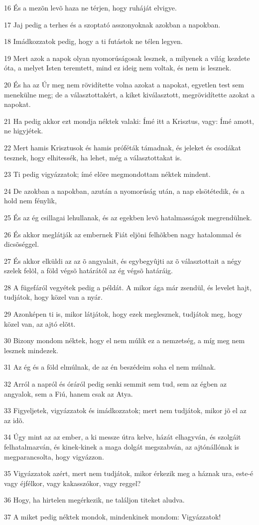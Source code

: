 \par 16 És a mezõn levõ haza ne térjen, hogy ruháját elvigye.
\par 17 Jaj pedig a terhes és a szoptató asszonyoknak azokban a napokban.
\par 18 Imádkozzatok pedig, hogy a ti futástok ne télen legyen.
\par 19 Mert azok a napok olyan nyomorúságosak lesznek, a milyenek a világ kezdete óta, a melyet Isten teremtett, mind ez ideig nem voltak, és nem is lesznek.
\par 20 És ha az Úr meg nem rövidítette volna azokat a napokat, egyetlen test sem menekülne meg; de a választottakért, a kiket kiválasztott, megrövidítette azokat a napokat.
\par 21 Ha pedig akkor ezt mondja néktek valaki: Ímé itt a Krisztus, vagy: Ímé amott, ne higyjétek.
\par 22 Mert hamis Krisztusok és hamis próféták támadnak, és jeleket és csodákat tesznek, hogy elhitessék, ha lehet, még a választottakat is.
\par 23 Ti pedig vigyázzatok; ímé elõre megmondottam néktek mindent.
\par 24 De azokban a napokban, azután a nyomorúság után, a nap elsötétedik, és a hold nem fénylik,
\par 25 És az ég csillagai lehullanak, és az egekben levõ hatalmasságok megrendülnek.
\par 26 És akkor meglátják az embernek Fiát eljõni felhõkben nagy hatalommal és dicsõséggel.
\par 27 És akkor elküldi az az õ angyalait, és egybegyûjti az õ választottait a négy szelek felõl, a föld végsõ határától az ég végsõ határáig.
\par 28 A fügefáról vegyétek pedig a példát. A mikor ága már zsendül, és levelet hajt, tudjátok, hogy közel van a nyár.
\par 29 Azonképen ti is, mikor látjátok, hogy ezek meglesznek, tudjátok meg, hogy közel van, az ajtó elõtt.
\par 30 Bizony mondom néktek, hogy el nem múlik ez a nemzetség, a míg meg nem lesznek mindezek.
\par 31 Az ég és a föld elmúlnak, de az én beszédeim soha el nem múlnak.
\par 32 Arról a napról és óráról pedig senki semmit sem tud, sem az égben az angyalok, sem a Fiú, hanem csak az Atya.
\par 33 Figyeljetek, vigyázzatok és imádkozzatok; mert nem tudjátok, mikor jõ el az az idõ.
\par 34 Úgy mint az az ember, a ki messze útra kelve, házát elhagyván, és szolgáit felhatalmazván, és kinek-kinek a maga dolgát megszabván, az ajtónállónak is megparancsolta, hogy vigyázzon.
\par 35 Vigyázzatok azért, mert nem tudjátok, mikor érkezik meg a háznak ura, este-é vagy éjfélkor, vagy kakasszókor, vagy reggel?
\par 36 Hogy, ha hirtelen megérkezik, ne találjon titeket aludva.
\par 37 A miket pedig néktek mondok, mindenkinek mondom: Vigyázzatok!

